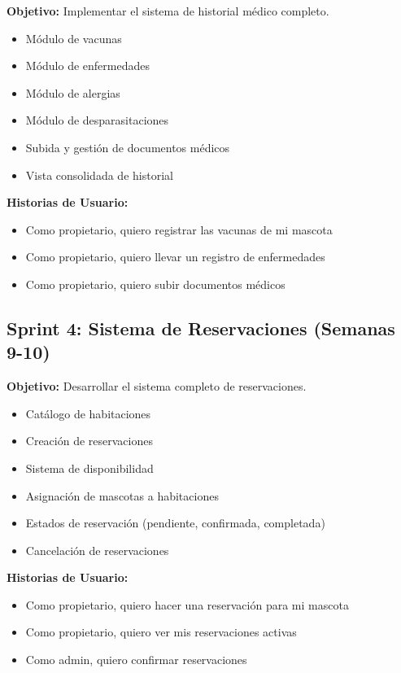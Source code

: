\textbf{Objetivo:} Implementar el sistema de historial médico completo.

\begin{itemize}
    \item Módulo de vacunas
    \item Módulo de enfermedades
    \item Módulo de alergias
    \item Módulo de desparasitaciones
    \item Subida y gestión de documentos médicos
    \item Vista consolidada de historial
\end{itemize}

\textbf{Historias de Usuario:}
\begin{itemize}
    \item Como propietario, quiero registrar las vacunas de mi mascota
    \item Como propietario, quiero llevar un registro de enfermedades
    \item Como propietario, quiero subir documentos médicos
\end{itemize}

\subsection{Sprint 4: Sistema de Reservaciones (Semanas 9-10)}

\textbf{Objetivo:} Desarrollar el sistema completo de reservaciones.

\begin{itemize}
    \item Catálogo de habitaciones
    \item Creación de reservaciones
    \item Sistema de disponibilidad
    \item Asignación de mascotas a habitaciones
    \item Estados de reservación (pendiente, confirmada, completada)
    \item Cancelación de reservaciones
\end{itemize}

\textbf{Historias de Usuario:}
\begin{itemize}
    \item Como propietario, quiero hacer una reservación para mi mascota
    \item Como propietario, quiero ver mis reservaciones activas
    \item Como admin, quiero confirmar reservaciones
\end{itemize}

